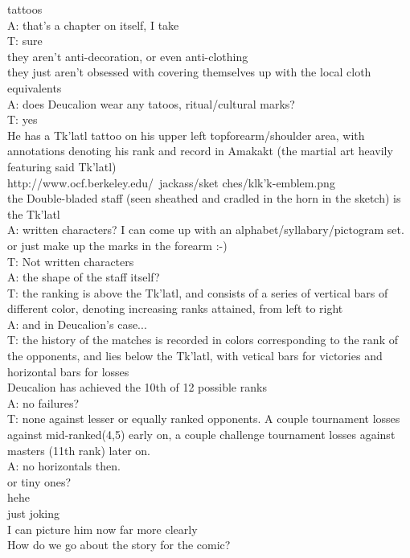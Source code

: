 tattoos\\
A: that's a chapter on itself, I take\\
T: sure\\
they aren't anti-decoration, or even anti-clothing\\
they just aren't obsessed with covering themselves up with the local cloth equivalents\\
A: does Deucalion wear any tatoos, ritual/cultural marks?\\
T: yes\\
He has a Tk'latl tattoo on his upper left topforearm/shoulder area, with annotations denoting his rank and record in Amakakt (the martial art heavily featuring said Tk'latl)\\
http://www.ocf.berkeley.edu/~jackass/sket ches/klk'k-emblem.png\\
the Double-bladed staff (seen sheathed and cradled in the horn in the sketch) is the Tk'latl\\
A: written characters? I can come up with an alphabet/syllabary/pictogram set.\\
or just make up the marks in the forearm :-)\\
T: Not written characters\\
A: the shape of the staff itself?\\
T: the ranking is above the Tk'latl, and consists of a series of vertical bars of different color, denoting increasing ranks attained, from left to right\\
A: and in Deucalion's case...\\
T: the history of the matches is recorded in colors corresponding to the rank of the opponents, and lies below the Tk'latl, with vetical bars for victories and horizontal bars for losses\\
Deucalion has achieved the 10th of 12 possible ranks\\
A: no failures?\\
T: none against lesser or equally ranked opponents. A couple tournament losses against mid-ranked(4,5) early on, a couple challenge tournament losses against masters (11th rank) later on.\\
A: no horizontals then.\\
or tiny ones?\\
hehe\\
just joking\\
I can picture him now far more clearly\\
How do we go about the story for the comic?\\
